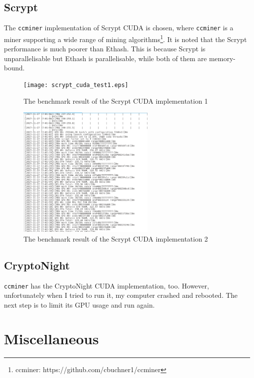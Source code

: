 \documentclass[11pt]{article}
\begin{document}
\subsection{Scrypt}

The \texttt{ccminer} implementation of Scrypt CUDA is chosen, where \texttt{ccminer} is a miner supporting a wide range of mining algorithms\footnote{ccminer: https://github.com/cbuchner1/ccminer}. It is noted that the Scrypt performance is much poorer than Ethash. This is because Scrypt is unparallelisable but Ethash is parallelisable, while both of them are memory-bound.

\begin{figure}[h]
    \centering
    \texttt{[image: scrypt\_cuda\_test1.eps]}
    \caption{The benchmark result of the Scrypt CUDA implementation 1}
    \label{fig:scrypt_cuda_test1}
\end{figure}

\begin{figure}[h]
    \centering
    \includegraphics[width=0.6\textwidth]{scrypt_cuda_test2.eps}
    \caption{The benchmark result of the Scrypt CUDA implementation 2}
    \label{fig:scrypt_cuda_test2}
\end{figure}


\subsection{CryptoNight}

\texttt{ccminer} has the CryptoNight CUDA implementation, too. However, unfortunately when I tried to run it, my computer crashed and rebooted. The next step is to limit its GPU usage and run again.

\section{Miscellaneous}
\end{document}
